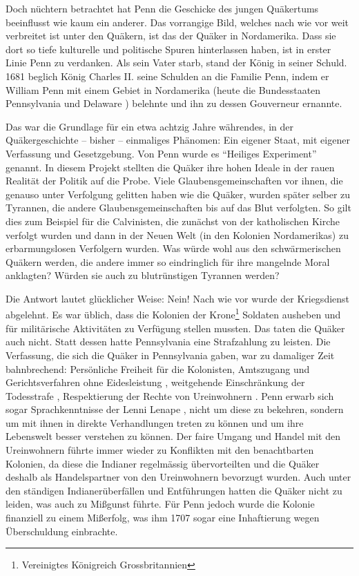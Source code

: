 \medskip

Doch nüchtern betrachtet hat Penn die Geschicke des jungen Quäkertums
beeinflusst wie kaum ein anderer. Das vorrangige Bild, welches nach wie vor weit
verbreitet ist unter den Quäkern, ist das der Quäker in Nordamerika. Dass sie
dort so tiefe kulturelle und politische Spuren hinterlassen haben, ist in erster
Linie Penn zu verdanken. Als sein Vater starb, stand der König in seiner Schuld.
1681 beglich König Charles II.  seine
Schulden  an die Familie Penn, indem er William Penn mit einem
Gebiet in Nordamerika (heute die Bundesstaaten Pennsylvania
 und Delaware ) belehnte und ihn
zu dessen Gouverneur ernannte.

\medskip

Das war die Grundlage für ein etwa achtzig Jahre währendes, in der Quäkergeschichte
-- bisher -- einmaliges Phänomen: Ein eigener Staat, mit eigener Verfassung und
Gesetzgebung. Von Penn wurde es "`Heiliges Experiment"' genannt. In diesem Projekt
stellten die Quäker ihre hohen Ideale in der rauen Realität der Politik auf die
Probe. Viele Glaubensgemeinschaften vor ihnen, die genauso unter Verfolgung
gelitten haben wie die Quäker, wurden später selber zu Tyrannen, die andere
Glaubensgemeinschaften bis auf das Blut verfolgten. So gilt dies zum Beispiel für die
Calvinisten, die zunächst von der katholischen
Kirche verfolgt wurden und dann in der Neuen Welt (in den Kolonien
Nordamerikas) zu erbarmungslosen Verfolgern wurden. Was würde wohl aus den
schwärmerischen Quäkern werden, die andere immer so eindringlich für ihre
mangelnde Moral anklagten? Würden sie auch zu blutrünstigen Tyrannen werden?

\medskip

Die Antwort lautet glücklicher Weise: Nein! Nach wie vor wurde der Kriegsdienst
abgelehnt. Es war üblich, dass die Kolonien der Krone\footnote{Vereinigtes
Königreich Grossbritannien} Soldaten ausheben und für militärische
Aktivitäten zu Verfügung stellen mussten. Das taten die Quäker auch nicht. Statt
dessen hatte Pennsylvania eine Strafzahlung zu leisten. Die Verfassung, die sich
die Quäker in Pennsylvania gaben, war zu damaliger Zeit bahnbrechend: Persönliche
Freiheit für die Kolonisten, Amtszugang und Gerichtsverfahren ohne
Eidesleistung , weitgehende Einschränkung der Todesstrafe
, Respektierung der Rechte von Ureinwohnern
. Penn erwarb sich sogar Sprachkenntnisse
 der Lenni Lenape , nicht
um diese zu bekehren, sondern um mit ihnen in direkte Verhandlungen treten zu
können und um ihre Lebenswelt besser verstehen zu können. Der faire Umgang und
Handel mit den Ureinwohnern führte immer wieder zu Konflikten mit den
benachtbarten Kolonien, da diese die Indianer regelmässig übervorteilten und
die Quäker deshalb als Handelspartner von den Ureinwohnern bevorzugt wurden.
Auch unter den ständigen Indianerüberfällen und Entführungen
hatten die Quäker nicht zu leiden, was auch zu Mißgunst führte. Für Penn jedoch
wurde die Kolonie finanziell zu einem Mißerfolg, was ihm 1707 sogar eine
Inhaftierung  wegen Überschuldung einbrachte.

